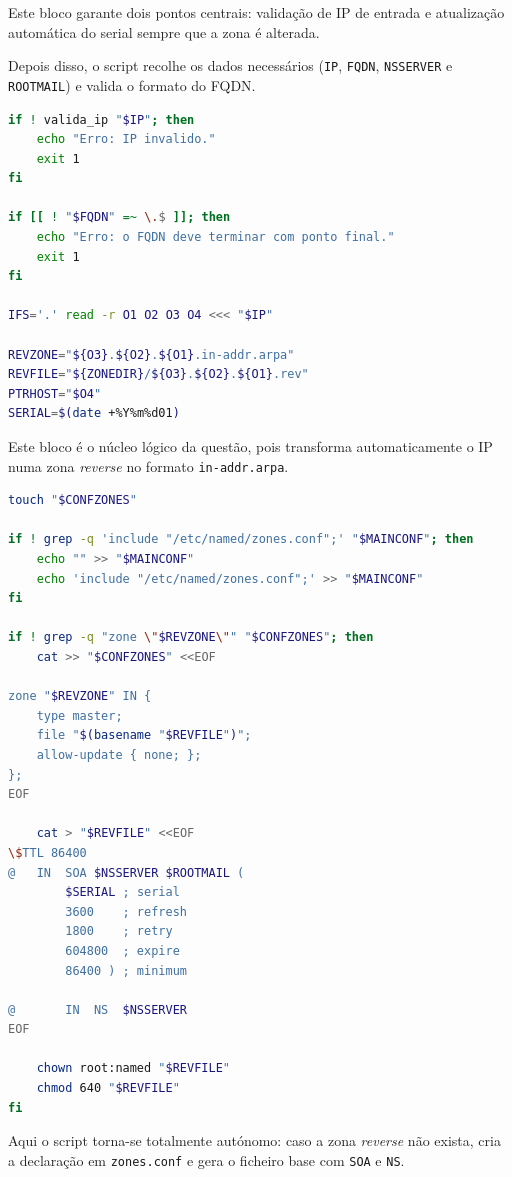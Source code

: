 Este bloco garante dois pontos centrais: valida\c{c}\~ao de IP de entrada e atualiza\c{c}\~ao autom\'atica do serial sempre que a zona \'{e} alterada.

Depois disso, o script recolhe os dados necess\'arios (\texttt{IP}, \texttt{FQDN}, \texttt{NSSERVER} e \texttt{ROOTMAIL}) e valida o formato do FQDN.

\begin{lstlisting}[language=bash,caption={Validacao do FQDN e calculo da zona reverse}]
if ! valida_ip "$IP"; then
    echo "Erro: IP invalido."
    exit 1
fi

if [[ ! "$FQDN" =~ \.$ ]]; then
    echo "Erro: o FQDN deve terminar com ponto final."
    exit 1
fi

IFS='.' read -r O1 O2 O3 O4 <<< "$IP"

REVZONE="${O3}.${O2}.${O1}.in-addr.arpa"
REVFILE="${ZONEDIR}/${O3}.${O2}.${O1}.rev"
PTRHOST="$O4"
SERIAL=$(date +%Y%m%d01)
\end{lstlisting}

Este bloco \'{e} o n\'ucleo l\'ogico da quest\~ao, pois transforma automaticamente o IP numa zona \textit{reverse} no formato \texttt{in-addr.arpa}.

\begin{lstlisting}[language=bash,caption={Criacao automatica da zona reverse}]
touch "$CONFZONES"

if ! grep -q 'include "/etc/named/zones.conf";' "$MAINCONF"; then
    echo "" >> "$MAINCONF"
    echo 'include "/etc/named/zones.conf";' >> "$MAINCONF"
fi

if ! grep -q "zone \"$REVZONE\"" "$CONFZONES"; then
    cat >> "$CONFZONES" <<EOF

zone "$REVZONE" IN {
    type master;
    file "$(basename "$REVFILE")";
    allow-update { none; };
};
EOF

    cat > "$REVFILE" <<EOF
\$TTL 86400
@   IN  SOA $NSSERVER $ROOTMAIL (
        $SERIAL ; serial
        3600    ; refresh
        1800    ; retry
        604800  ; expire
        86400 ) ; minimum

@       IN  NS  $NSSERVER
EOF

    chown root:named "$REVFILE"
    chmod 640 "$REVFILE"
fi
\end{lstlisting}

Aqui o script torna-se totalmente aut\'onomo: caso a zona \textit{reverse} n\~ao exista, cria a declara\c{c}\~ao em \texttt{zones.conf} e gera o ficheiro base com \texttt{SOA} e \texttt{NS}.

